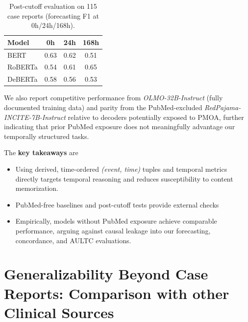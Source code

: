 \begin{table}[!htbp]
\centering
\footnotesize
\setlength{\tabcolsep}{6pt}
\renewcommand{\arraystretch}{1.1}
\begin{tabular}{lccc}
\hline
\textbf{Model} & \textbf{0h} & \textbf{24h} & \textbf{168h} \\
\hline
BERT     & 0.63 & 0.62 & 0.51 \\
RoBERTa  & 0.54 & 0.61 & 0.65 \\
DeBERTa  & 0.58 & 0.56 & 0.53 \\
\hline
\end{tabular}
\caption{Post-cutoff evaluation on 115 case reports (forecasting F1 at 0h/24h/168h).}
\label{tab:postcutoff_f1}
\end{table}

We also report competitive performance from \emph{OLMO-32B-Instruct} (fully documented training data) and parity from the PubMed-excluded \emph{RedPajama-INCITE-7B-Instruct} relative to decoders potentially exposed to PMOA, further indicating that prior PubMed exposure does not meaningfully advantage our temporally structured tasks.

The \textbf{key takeaways} are 
\begin{itemize}
    \item Using derived, time-ordered \emph{(event, time)} tuples and temporal metrics directly targets temporal reasoning and reduces susceptibility to content memorization.
    \item PubMed-free baselines and post-cutoff tests provide external checks
    \item Empirically, models without PubMed exposure achieve comparable performance, arguing against causal leakage into our forecasting, concordance, and AULTC evaluations.
\end{itemize}


\section{Generalizability Beyond Case Reports: Comparison with other Clinical Sources}
\label{apd:beyond_pmoa}

